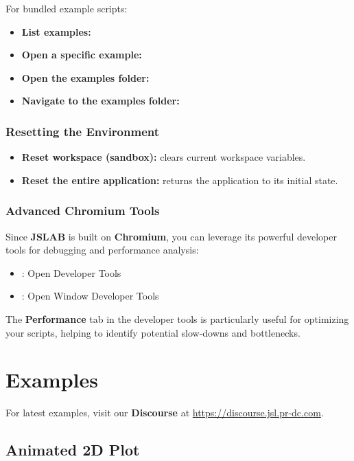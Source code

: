 \documentclass[12pt,a4paper]{article}
\begin{document}
For bundled example scripts:
\begin{itemize}
  \item \textbf{List examples:} 
  \item \textbf{Open a specific example:} 
  \item \textbf{Open the examples folder:} 
  \item \textbf{Navigate to the examples folder:} 
\end{itemize}

\subsubsection{Resetting the Environment}
\begin{itemize}
  \item \textbf{Reset workspace (sandbox):}  clears current workspace variables.
  \item \textbf{Reset the entire application:}  returns the application to its initial state.
\end{itemize}

\subsubsection{Advanced Chromium Tools}
Since \textbf{JSLAB} is built on \textbf{Chromium}, you can leverage its powerful developer tools for debugging and performance analysis:
\begin{itemize}
  \item {}: Open Developer Tools
  \item {}: Open Window Developer Tools
\end{itemize}

The \textbf{Performance} tab in the developer tools is particularly useful for optimizing your scripts, helping to identify potential slow-downs and bottlenecks.

\section{Examples}

For latest examples, visit our \textbf{Discourse} at \url{https://discourse.jsl.pr-dc.com}.

\subsection{Animated 2D Plot}
\label{sec:animated-2d-plot}
\end{document}
